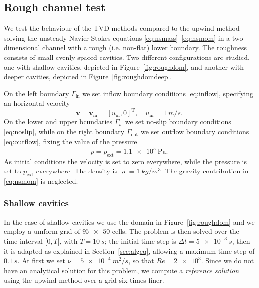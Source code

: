 \subsection{Rough channel test} \label{subsec:roughchannel}
We test the behaviour of the TVD methods compared to the upwind method solving 
the unsteady Navier-Stokes equations \eqref{eq:nsmass}--\eqref{eq:nsmom} in 
a two-dimensional channel with a rough (i.e. non-flat) lower boundary. The 
roughness consists of small evenly spaced cavities. Two different 
configurations are studied, one with shallow cavities, depicted in 
Figure~\ref{fig:roughdom}, and another with deeper cavities, depicted in 
Figure~\ref{fig:roughdomdeep}.

On the left boundary $\Gamma_\text{in}$ we set inflow boundary conditions 
\eqref{eq:inflow}, specifying an horizontal velocity
\begin{equation}
	\mathbf{v} = \mathbf{v}_\text{in} = [u_\text{in}, 0]^\mathrm{T}, \quad 
	u_\text{in} = \SI{1}{m/s}.
\end{equation}
On the lower and upper boundaries $\Gamma_w$ we set no-slip boundary conditions 
\eqref{eq:noslip}, while on the right boundary $\Gamma_\text{out}$ we set 
outflow boundary conditions \eqref{eq:outflow}, fixing the value of the pressure
\begin{equation}
	p = p_\text{ext} = \SI{1.1e5}{\pascal}.
\end{equation}
As initial conditions the velocity is set to zero everywhere, while the 
pressure is set to $p_\text{ext}$ everywhere. The density is 
$\varrho=\SI{1}{kg/m^3}$. The gravity contribution in \eqref{eq:nsmom} is 
neglected.
%
\subsubsection{Shallow cavities}
In the case of shallow cavities we use the domain in Figure~\ref{fig:roughdom} 
and we employ a uniform grid of $\num{95x50}$ cells. The problem is then solved 
over the time interval [$0,T$], with $T=\SI{10}{s}$; the initial time-step is 
$\Delta t=\SI{5e-3}{s}$, then it is adapted as explained in 
Section~\ref{sec:algeq}, allowing a maximum time-step of $\SI{0.1}{s}$. 
At first we set $\nu=\SI{5e-4}{m^2/s}$, so that $Re=\num{2e3}$. Since we do not 
have an analytical solution for this problem, we compute a \emph{reference 
solution} using the upwind method over a grid six times finer.

